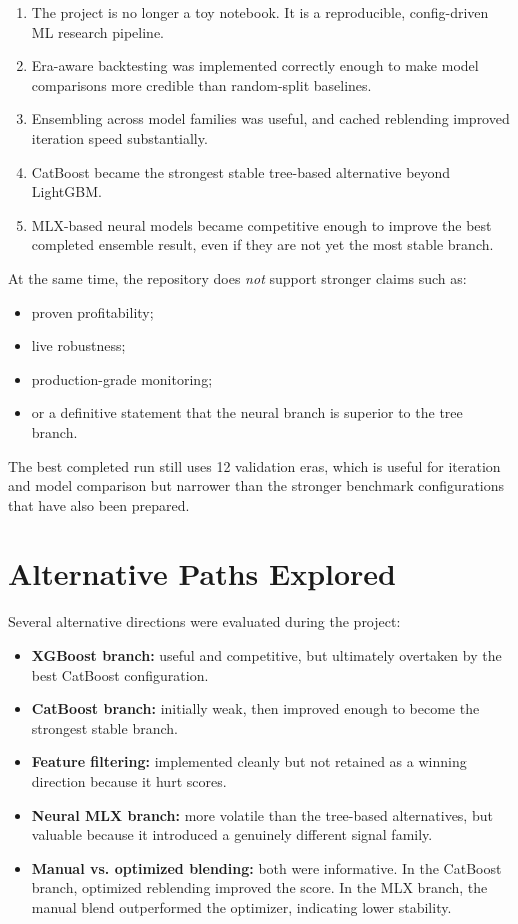 \documentclass[11pt]{article}
\begin{document}
\begin{enumerate}[leftmargin=1.5em]
  \item The project is no longer a toy notebook. It is a reproducible, config-driven ML research pipeline.
  \item Era-aware backtesting was implemented correctly enough to make model comparisons more credible than random-split baselines.
  \item Ensembling across model families was useful, and cached reblending improved iteration speed substantially.
  \item CatBoost became the strongest stable tree-based alternative beyond LightGBM.
  \item MLX-based neural models became competitive enough to improve the best completed ensemble result, even if they are not yet the most stable branch.
\end{enumerate}

At the same time, the repository does \emph{not} support stronger claims such as:

\begin{itemize}[leftmargin=1.5em]
  \item proven profitability;
  \item live robustness;
  \item production-grade monitoring;
  \item or a definitive statement that the neural branch is superior to the tree branch.
\end{itemize}

The best completed run still uses 12 validation eras, which is useful for iteration and model comparison but narrower than the stronger benchmark configurations that have also been prepared.

\section{Alternative Paths Explored}

Several alternative directions were evaluated during the project:

\begin{itemize}[leftmargin=1.5em]
  \item \textbf{XGBoost branch:} useful and competitive, but ultimately overtaken by the best CatBoost configuration.
  \item \textbf{CatBoost branch:} initially weak, then improved enough to become the strongest stable branch.
  \item \textbf{Feature filtering:} implemented cleanly but not retained as a winning direction because it hurt scores.
  \item \textbf{Neural MLX branch:} more volatile than the tree-based alternatives, but valuable because it introduced a genuinely different signal family.
  \item \textbf{Manual vs. optimized blending:} both were informative. In the CatBoost branch, optimized reblending improved the score. In the MLX branch, the manual blend outperformed the optimizer, indicating lower stability.
\end{itemize}
\end{document}
